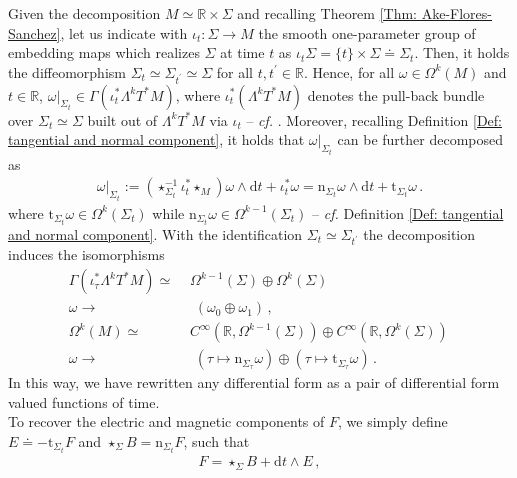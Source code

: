Given the decomposition $M\simeq\mathbb{R}\times\Sigma$ and recalling Theorem \ref{Thm: Ake-Flores-Sanchez}, let us indicate with $\iota_ t\colon\Sigma\to M$ the smooth one-parameter group of embedding maps which realizes $\Sigma$ at time $t$ as $\iota_t\Sigma=\lbrace  t\rbrace\times\Sigma\doteq\Sigma_t$. Then, it holds the diffeomorphism $\Sigma_t\simeq\Sigma_{t^\prime}\simeq \Sigma$ for all $t,t^\prime\in\mathbb{R}$.
Hence, for all $\omega\in\Omega^k(M)$ and $t\in\mathbb{R}$, $\omega|_{\Sigma_t}\in \Gamma(\iota_t^*\Lambda^kT^*M)$, where  $\iota_t^*(\Lambda^kT^*M)$ denotes the pull-back bundle over $\Sigma_t\simeq\Sigma$ built out of $\Lambda^kT^*M$ via $\iota_t$ -- \textit{cf.} \cite{husemoller1966fibre}.
Moreover, recalling Definition \ref{Def: tangential and normal component}, it holds that $\omega|_{\Sigma_t}$ can be further decomposed as
\begin{align*}
\omega|_{\Sigma_t}:=
(\star_{\Sigma_t}^{-1}\iota_t^*\star_M)\omega\wedge\mathrm{d}t+
\iota_t^*\omega=
\mathrm{n}_{\Sigma_t}\omega\wedge\mathrm{d}t+
\mathrm{t}_{\Sigma_t}\omega\,.
\end{align*}
where $\mathrm{t}_{\Sigma_t}\omega\in\Omega^k(\Sigma_t)$ while $\mathrm{n}_{\Sigma_t}\omega\in\Omega^{k-1}(\Sigma_t)$ -- \textit{cf.} Definition \ref{Def: tangential and normal component}.
With the identification $\Sigma_t\simeq\Sigma_{t^\prime}$ the decomposition induces the isomorphisms
\begin{align}
\nonumber\Gamma(\iota_\tau^*\Lambda^kT^*M)\simeq\,\, &\Omega^{k-1}(\Sigma)\oplus \Omega^k(\Sigma)\\
\omega\to&\,\,(\omega_0\oplus\omega_1)\,,\\
\nonumber \Omega^k(M)\simeq\, &C^\infty(\mathbb{R},\Omega^{k-1}(\Sigma))\oplus C^\infty(\mathbb{R},\Omega^k(\Sigma))\,\\
\omega\to&\,\,(\tau\mapsto\mathrm{n}_{\Sigma_\tau}\omega)\oplus(\tau\mapsto\mathrm{t}_{\Sigma_\tau}\omega)\,.
\end{align}
In this way, we have rewritten any differential form as a pair of differential form valued functions of time.\\
To recover the electric and magnetic components of $F$, we simply define $E\doteq-\mathrm{t}_{\Sigma_t}F$ and $\star_\Sigma B=\mathrm{n}_{\Sigma_t} F$, such that
\begin{align}\label{Eqn: electric and magnetic components}
F=\star_\Sigma B+\mathrm{d}t\wedge E\,,
\end{align}
